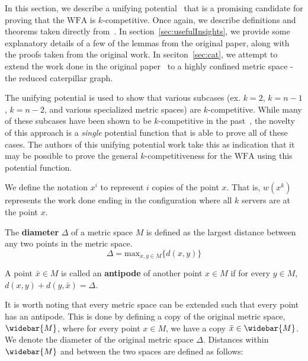 In this section, we describe a unifying potential~\cite{unifyingPotential2021} that is a promising candidate for proving that the $\mathrm{WFA}$ is $k$-competitive. Once again, we describe definitions and theorems taken directly from~\cite{unifyingPotential2021}. In section~\ref{sec:usefulInsights}, we provide some explanatory details of a few of the lemmas from the original paper, along with the proofs taken from the original work. In seciton~\ref{sec:cat}, we attempt to extend the work done in the original paper~\cite{unifyingPotential2021} to a highly confined metric space - the reduced caterpillar graph.

The unifying potential is used to show that various subcases (ex. $k=2$, $k=n-1$, $k=n-2$, and various specialized metric spaces) are $k$-competitive. While many of these subcases have been shown to be $k$-competitive in the past~\cite{server1991, server2009, server1996, server2004, server2002}, the novelty of this approach is a \textit{single} potential function that is able to prove all of these cases. The authors of this unifying potential work take this as indication that it may be possible to prove the general $k$-competitiveness for the $\mathrm{WFA}$ using this potential function.

\begin{definition}
    We define the notation $x^i$ to represent $i$ copies of the point $x$. That is, $w(x^k)$ represents the work done ending in the configuration where all $k$ servers are at the point $x$.
\end{definition}

\begin{definition}
    The \textbf{diameter} $\Delta$ of a metric space $M$ is defined as the largest distance between any two points in the metric space.
    \begin{equation*}
        \Delta = \mathrm{max}_{x, y \in M} \{ d(x,y)\}
    \end{equation*}
\end{definition}

\begin{definition}
    A point $\bar{x} \in M$ is called an \textbf{antipode} of another point $x \in M$ if for every $y \in M$, $d(x,y) + d(y, \bar{x}) = \Delta$.
\end{definition}

It is worth noting that every metric space can be extended such that every point has an antipode. This is done by defining a copy of the original metric space, $\widebar{M}$, where for every point $x \in M$, we have a copy $\bar{x} \in \widebar{M}$. We denote the diameter of the original metric space $\Delta$. Distances within $\widebar{M}$ and between the two spaces are defined as follows:


